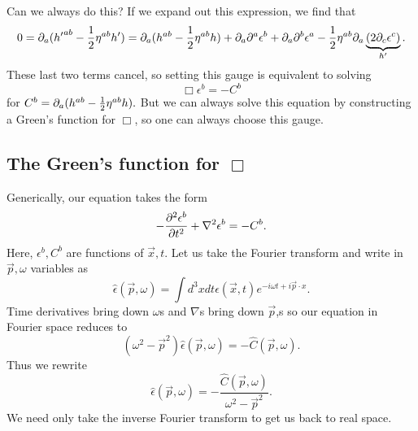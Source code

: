 Can we always do this? If we expand out this expression, we find that
$$0=\partial_a({h'}^{ab}-\frac{1}{2}\eta^{ab}h')=\partial_a(h^{ab}-\frac{1}{2}\eta^{ab}h)+\partial_a \partial^a \epsilon^b +\partial_a \partial^b \epsilon^a -\frac{1}{2} \eta^{ab} \partial_a \underbrace{(2\partial_c \epsilon^c)}_{h'}.$$
These last two terms cancel, so setting this gauge is equivalent to solving
$$\Box \epsilon^b = -C^b$$ for
$C^b=\partial_a(h^{ab}-\frac{1}{2}\eta^{ab}h).$
But we can always solve this equation by constructing a Green's function for $\Box$, so one can always choose this gauge.

\subsection*{The Green's function for $\Box$} Generically, our equation takes the form
$$-\frac{\partial^2 \epsilon^b}{\partial t^2}+\nabla^2 \epsilon^b =-C^b.$$
Here, $\epsilon^b, C^b$ are functions of $\vec x,t$. Let us take the Fourier transform and write in $\vec p,\omega$ variables as
$$\hat \epsilon(\vec p,\omega)=\int d^3x dt \epsilon(\vec x,t) e^{-i\omega t +i\vec p \cdot x}.$$
Time derivatives bring down $\omega$s and $\nabla$s bring down $\vec p$,s so our equation in Fourier space reduces to
$$(\omega^2-\vec p^2) \hat \epsilon(\vec p, \omega)=-\hat C(\vec p, \omega).$$
Thus we rewrite
$$\hat \epsilon(\vec p, \omega)=-\frac{\hat C(\vec p,\omega)}{\omega^2-\vec p^2}.$$
We need only take the inverse Fourier transform to get us back to real space.